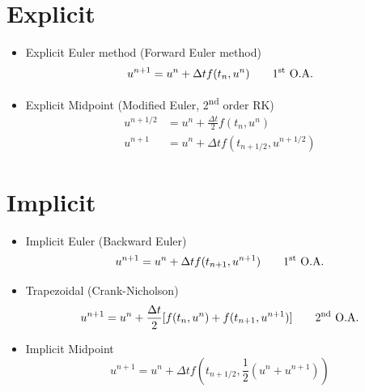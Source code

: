 \documentclass[oneside,a4paper,11pt]{report}
\begin{document}
\section{Explicit}
\begin{itemize}

\item Explicit Euler method (Forward Euler method)
\begin{equation}
u^{n+1} = u^n + \Delta t f(t_n, u^n) \qquad \text{1\textsuperscript{st} O.A.}
\end{equation}

\item Explicit Midpoint (Modified Euler, 2\textsuperscript{nd} order RK)
\begin{align}
    u^{n+1/2} &= u^n + \frac{\Delta t}{2} f(t_n, u^n) \nonumber \\
    u^{n+1}   &= u^n + \Delta t f(t_{n+1/2}, u^{n+1/2})
\end{align}

\end{itemize}

\section{Implicit}
\begin{itemize}

\item Implicit Euler (Backward Euler)
\begin{equation}
u^{n+1} = u^n + \Delta t f(t_{n+1}, u^{n+1}) \qquad \text{1\textsuperscript{st} O.A.}
\end{equation}

\item Trapezoidal (Crank-Nicholson)
\begin{equation}
u^{n+1} = u^n + \frac{\Delta t}{2} [ f(t_n, u^n) + f(t_{n+1}, u^{n+1}) ] \qquad \text{2\textsuperscript{nd} O.A.}
\end{equation}

\item Implicit Midpoint
\begin{equation}
    u^{n+1} = u^n + \Delta t f\left (t_{n+1/2}, \frac{1}{2} \left (u^n + u^{n+1} \right ) \right )
\end{equation}

\end{itemize}
\end{document}
